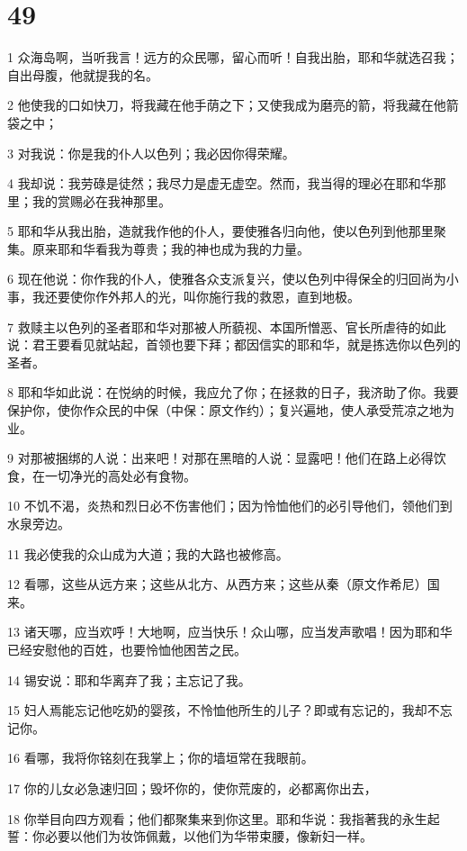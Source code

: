\chapter{49}

\par 1 众海岛啊，当听我言！远方的众民哪，留心而听！自我出胎，耶和华就选召我；自出母腹，他就提我的名。
\par 2 他使我的口如快刀，将我藏在他手荫之下；又使我成为磨亮的箭，将我藏在他箭袋之中；
\par 3 对我说：你是我的仆人以色列；我必因你得荣耀。
\par 4 我却说：我劳碌是徒然；我尽力是虚无虚空。然而，我当得的理必在耶和华那里；我的赏赐必在我神那里。
\par 5 耶和华从我出胎，造就我作他的仆人，要使雅各归向他，使以色列到他那里聚集。原来耶和华看我为尊贵；我的神也成为我的力量。
\par 6 现在他说：你作我的仆人，使雅各众支派复兴，使以色列中得保全的归回尚为小事，我还要使你作外邦人的光，叫你施行我的救恩，直到地极。
\par 7 救赎主以色列的圣者耶和华对那被人所藐视、本国所憎恶、官长所虐待的如此说：君王要看见就站起，首领也要下拜；都因信实的耶和华，就是拣选你以色列的圣者。
\par 8 耶和华如此说：在悦纳的时候，我应允了你；在拯救的日子，我济助了你。我要保护你，使你作众民的中保（中保：原文作约）；复兴遍地，使人承受荒凉之地为业。
\par 9 对那被捆绑的人说：出来吧！对那在黑暗的人说：显露吧！他们在路上必得饮食，在一切净光的高处必有食物。
\par 10 不饥不渴，炎热和烈日必不伤害他们；因为怜恤他们的必引导他们，领他们到水泉旁边。
\par 11 我必使我的众山成为大道；我的大路也被修高。
\par 12 看哪，这些从远方来；这些从北方、从西方来；这些从秦（原文作希尼）国来。
\par 13 诸天哪，应当欢呼！大地啊，应当快乐！众山哪，应当发声歌唱！因为耶和华已经安慰他的百姓，也要怜恤他困苦之民。
\par 14 锡安说：耶和华离弃了我；主忘记了我。
\par 15 妇人焉能忘记他吃奶的婴孩，不怜恤他所生的儿子？即或有忘记的，我却不忘记你。
\par 16 看哪，我将你铭刻在我掌上；你的墙垣常在我眼前。
\par 17 你的儿女必急速归回；毁坏你的，使你荒废的，必都离你出去，
\par 18 你举目向四方观看；他们都聚集来到你这里。耶和华说：我指著我的永生起誓：你必要以他们为妆饰佩戴，以他们为华带束腰，像新妇一样。
